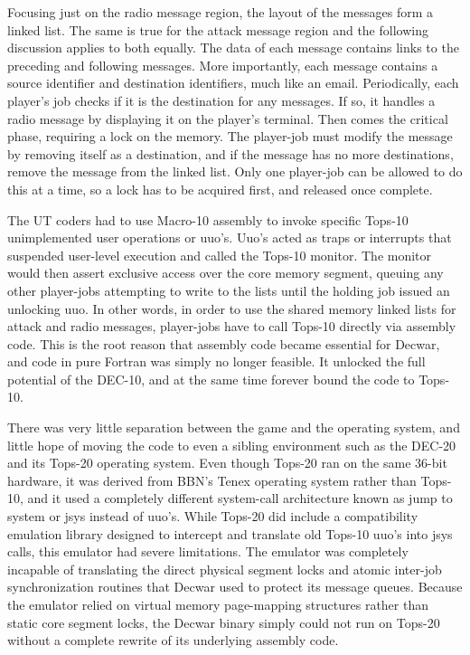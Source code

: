 Focusing just on the radio message region, the layout of the messages form a linked list. The same is true for the attack message region and the following discussion applies to both equally. The data of each message contains links to the preceding and following messages. More importantly, each message contains a source identifier and destination identifiers, much like an email. Periodically, each player’s job checks if it is the destination for any messages. If so, it handles a radio message by displaying it on the player’s terminal. Then comes the critical phase, requiring a lock on the memory. The player-job must modify the message by removing itself as a destination, and if the message has no more destinations, remove the message from the linked list. Only one player-job can be allowed to do this at a time, so a lock has to be acquired first, and released once complete. 

The UT coders had to use Macro-10 assembly to invoke specific Tops-10 unimplemented user operations or uuo’s. Uuo’s acted as traps or interrupts that suspended user-level execution and called the Tops-10 monitor. The monitor would then assert exclusive access over the core memory segment, queuing any other player-jobs attempting to write to the lists until the holding job issued an unlocking uuo. In other words, in order to use the shared memory linked lists for attack and radio messages, player-jobs have to call Tops-10 directly via assembly code. This is the root reason that assembly code became essential for Decwar, and code in pure Fortran was simply no longer feasible. It unlocked the full potential of the DEC-10, and at the same time forever bound the code to Tops-10. 

There was very little separation between the game and the operating system, and little hope of moving the code to even a sibling environment such as the DEC-20 and its Tops-20 operating system. Even though Tops-20 ran on the same 36-bit hardware, it was derived from BBN's Tenex operating system rather than Tops-10, and it used a completely different system-call architecture known as jump to system or jsys instead of uuo’s. While Tops-20 did include a compatibility emulation library designed to intercept and translate old Tops-10 uuo’s into jsys calls, this emulator had severe limitations. The emulator was completely incapable of translating the direct physical segment locks and atomic inter-job synchronization routines that Decwar used to protect its message queues. Because the emulator relied on virtual memory page-mapping structures rather than static core segment locks, the Decwar binary simply could not run on Tops-20 without a complete rewrite of its underlying assembly code.


